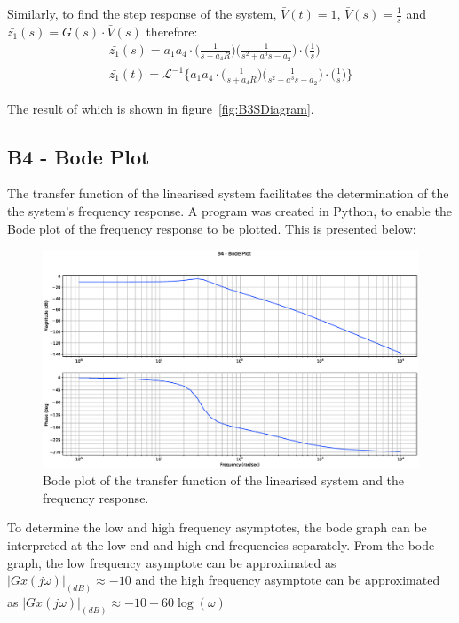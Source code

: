 \documentclass[a4paper,10pt,reqno]{amsart}
\numberwithin{equation}{section}
\begin{document}
\par Similarly, to find the step response of the system, $\bar{V}(t)=1$, $\bar{V}(s) = \frac{1}{s}$ and $\bar{z_1}(s) = G(s)\cdot{\bar{V}(s)}$ therefore:
\begin{gather}
    \bar{z_1}(s) = a_1a_4\cdot\bigg(\frac{1}{s+a_4R}\bigg)\bigg(\frac{1}{s^2+a^3s-a_2}\bigg)\cdot\bigg(\frac{1}{s}\bigg)
    \\
    \bar{z_1}(t) = \mathcal{L}^{-1}\bigg\{ a_1a_4\cdot\bigg(\frac{1}{s+a_4R}\bigg)\bigg(\frac{1}{s^2+a^3s-a_2}\bigg)\cdot\bigg(\frac{1}{s}\bigg) \bigg\}
\end{gather}
\par The result of which is shown in figure~\ref{fig:B3SDiagram}.

\subsection{B4 - Bode Plot}
The transfer function of the linearised system facilitates the determination of the the system's frequency response. A program was created in Python, to enable the Bode plot of the frequency response to be plotted. This is presented below:
\begin{figure}[h]
 \centering
 \includegraphics[width=1\linewidth]{Figures/B4_Bode.eps}
 \caption{Bode plot of the transfer function of the linearised system and the frequency response.}
 \label{fig:B4Diagram}
\end{figure}
To determine the low and high frequency asymptotes, the bode graph can be interpreted at the low-end and high-end frequencies separately. From the bode graph, the low frequency asymptote can be approximated as $|Gx(j\omega)|_{(dB)} \approx -10$ and the high frequency asymptote can be approximated as $|Gx(j\omega)|_{(dB)} \approx -10-60\log({\omega})$
\end{document}
